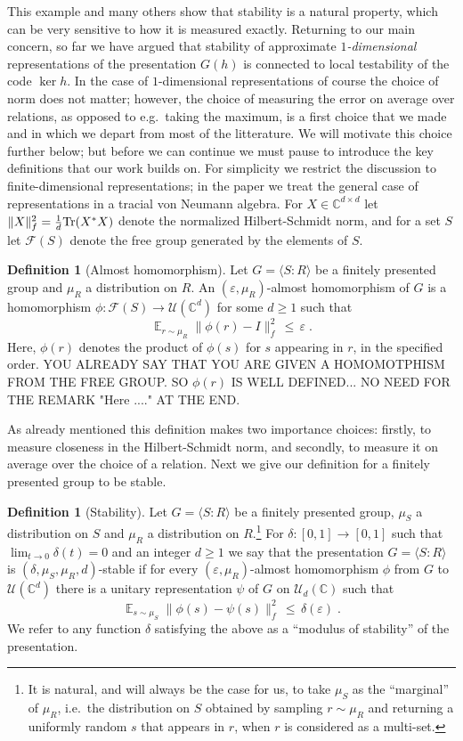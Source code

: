 \documentclass[11pt]{article}
\theoremstyle{definition}
\newtheorem{definition}[theorem]{Definition}
\newcommand{\Tr}{\mbox{\rm Tr}}
\newcommand{\Id}{\ensuremath{I}}
\DeclareMathOperator*{\Expectation}{\mathbb{E}}
\newcommand{\Es}[1]{\Expectation_{#1}}
\newcommand{\C}{\ensuremath{\mathbb{C}}}
\newcommand{\mF}{\ensuremath{\mathcal{F}}}
\newcommand{\mU}{\ensuremath{\mathcal{U}}}
\newcommand{\eps}{\varepsilon}
\begin{document}
This example and many others show that stability is a natural property, which can be very sensitive to how it is measured exactly. Returning to our main concern, so far we have argued that 
stability of approximate \emph{$1$-dimensional} representations of the presentation $G(h)$ is connected to local testability of the code $\ker h$. In the case of $1$-dimensional representations of course the choice of norm does not matter; however, the choice of measuring the error on average over relations, as opposed to e.g.\ taking the maximum, is a first choice that we made and in which we depart from most of the litterature. We will motivate this choice further below; but before we can continue we must pause to introduce the key definitions that our work builds on. For simplicity we restrict the discussion to finite-dimensional representations; in the paper we treat the general case of representations in a tracial von Neumann algebra. For $X\in \C^{d\times d}$ let $\|X\|_f^2 = \frac{1}{d}\Tr(X^* X)$ denote the normalized Hilbert-Schmidt norm,  and for a set $S$ let $\mF(S)$ denote the free group generated by the elements of $S$. 

\begin{definition}[Almost homomorphism]\label{def:approx-hom-intro}
Let $G = \langle S:R\rangle $ be a finitely presented group and $\mu_R$ a distribution on $R$. An $(\eps,\mu_R)$-almost homomorphism of $G$ is a homomorphism $\phi:\mF(S)\to\mU(\C^d)$ for some $d\geq 1$ such that
\[ \Es{r\sim \mu_R} \big\|  \phi(r) - \Id \big \|_f^2 \,\leq\, \eps\;.\]
Here, $\phi(r)$ denotes the product of $\phi(s)$ for $s$ appearing in $r$, in the specified order. 
{\color{red} YOU ALREADY SAY THAT YOU ARE GIVEN A HOMOMOTPHISM FROM THE FREE GROUP. SO $\phi(r)$ IS WELL DEFINED... NO NEED FOR THE REMARK "Here ...." AT THE END}.
\end{definition}

As already mentioned this definition makes two importance choices: firstly, to measure closeness in the Hilbert-Schmidt norm, and secondly, to measure it on average over the choice of a relation. Next we give our definition for a finitely presented group to be stable.  

\begin{definition}[Stability]\label{def:eff-stab-intro}
Let $G = \langle S:R\rangle $ be a finitely presented group, $\mu_S$ a distribution on $S$ and $\mu_R$ a distribution on $R$.\footnote{It is natural, and will always be the case for us, to take $\mu_S$ as the ``marginal'' of $\mu_R$, i.e.\ the distribution on $S$ obtained by sampling $r\sim\mu_R$ and returning a uniformly random $s$ that appears in $r$, when $r$ is considered as a multi-set.} For $\delta:[0,1]\to[0,1]$ such that $\lim_{t\to 0}\delta(t)=0$ and an integer $d\geq 1$ we say that the presentation $G=\langle S:R\rangle$ is $(\delta,\mu_S,\mu_R,d)$-stable if for every $(\eps,\mu_R)$-almost homomorphism $\phi$ from $G$ to $\mU(\C^d)$ there is a unitary representation $\psi$ of $G$ on $\mU_d(\C)$ such that
\[ \Es{s\sim \mu_S} \big\|  \phi(s) - \psi(s) \big \|_f^2 \,\leq\, \delta(\eps)\;.\]
We refer to any function $\delta$ satisfying the above as a ``modulus of stability'' of the presentation.
\end{definition}
\end{document}
